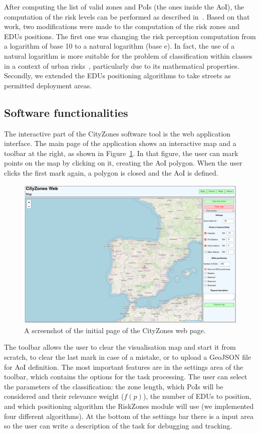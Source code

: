 \begin{refsection}
After computing the list of valid zones and PoIs (the ones inside the AoI), the computation of the risk levels can be performed as described in~\cite{riskzones}. Based on that work, two modifications were made to the computation of the risk zones and EDUs positions. The first one was changing the risk perception computation from a logarithm of base 10 to a natural logarithm (base $\mathrm{e}$). In fact, the use of a natural logarithm is more suitable for the problem of classification within classes in a context of urban risks~\cite{log1,log2}, particularly due to its mathematical properties. Secondly, we extended the EDUs positioning algorithms to take streets as permitted deployment areas.

\subsection{Software functionalities}

The interactive part of the CityZones software tool is the web application interface. The main page of the application shows an interactive map and a toolbar at the right, as shown in Figure~\ref{fig:web_map}. In that figure, the user can mark points on the map by clicking on it, creating the AoI polygon. When the user clicks the first mark again, a polygon is closed and the AoI is defined.

\begin{figure}[htb]
  \centering
  \includegraphics[width=.8\linewidth]{Chapters/3-CityZones/img/cityzones_map.png}
  \caption{A screenshot of the initial page of the CityZones web page.}\label{fig:web_map}
\end{figure}

The toolbar allows the user to clear the visualisation map and start it from scratch, to clear the last mark in case of a mistake, or to upload a GeoJSON file for AoI definition. The most important features are in the settings area of the toolbar, which contains the options for the task processing. The user can select the parameters of the classification: the zone length, which PoIs will be considered and their relevance weight ($f(p)$), the number of EDUs to position, and which positioning algorithm the RiskZones module will use (we implemented four different algorithms). At the bottom of the settings bar there is a input area so the user can write a description of the task for debugging and tracking.


\end{refsection}
